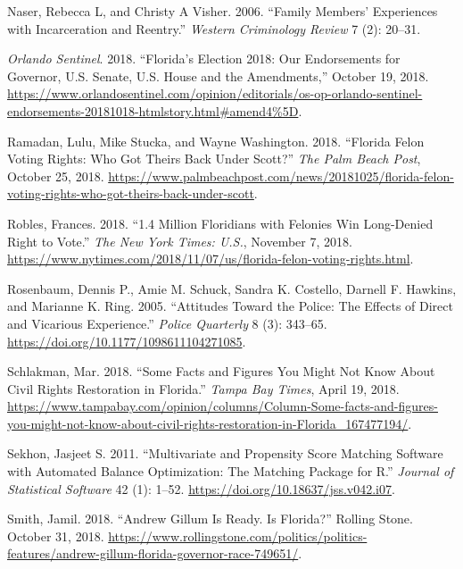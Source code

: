 \documentclass[
  12pt,
]{article}
\newlength{\cslhangindent}
\newenvironment{cslreferences}%
  {\setlength{\parindent}{0pt}%
  \everypar{\setlength{\hangindent}{\cslhangindent}}\ignorespaces}%
  {\par}
\begin{document}
\begin{cslreferences}
\leavevmode\hypertarget{ref-Naser2006}{}%
Naser, Rebecca L, and Christy A Visher. 2006. ``Family Members' Experiences with Incarceration and Reentry.'' \emph{Western Criminology Review} 7 (2): 20--31.

\leavevmode\hypertarget{ref-ORLANDOSENTINEL2018}{}%
\emph{Orlando Sentinel}. 2018. ``Florida's Election 2018: Our Endorsements for Governor, U.S. Senate, U.S. House and the Amendments,'' October 19, 2018. \url{https://www.orlandosentinel.com/opinion/editorials/os-op-orlando-sentinel-endorsements-20181018-htmlstory.html\#amend4\%5D}.

\leavevmode\hypertarget{ref-Ramadan2018}{}%
Ramadan, Lulu, Mike Stucka, and Wayne Washington. 2018. ``Florida Felon Voting Rights: Who Got Theirs Back Under Scott?'' \emph{The Palm Beach Post}, October 25, 2018. \url{https://www.palmbeachpost.com/news/20181025/florida-felon-voting-rights-who-got-theirs-back-under-scott}.

\leavevmode\hypertarget{ref-Robles2018}{}%
Robles, Frances. 2018. ``1.4 Million Floridians with Felonies Win Long-Denied Right to Vote.'' \emph{The New York Times: U.S.}, November 7, 2018. \url{https://www.nytimes.com/2018/11/07/us/florida-felon-voting-rights.html}.

\leavevmode\hypertarget{ref-Rosenbaum2005}{}%
Rosenbaum, Dennis P., Amie M. Schuck, Sandra K. Costello, Darnell F. Hawkins, and Marianne K. Ring. 2005. ``Attitudes Toward the Police: The Effects of Direct and Vicarious Experience.'' \emph{Police Quarterly} 8 (3): 343--65. \url{https://doi.org/10.1177/1098611104271085}.

\leavevmode\hypertarget{ref-Schlakman2018}{}%
Schlakman, Mar. 2018. ``Some Facts and Figures You Might Not Know About Civil Rights Restoration in Florida.'' \emph{Tampa Bay Times}, April 19, 2018. \url{https://www.tampabay.com/opinion/columns/Column-Some-facts-and-figures-you-might-not-know-about-civil-rights-restoration-in-Florida_167477194/}.

\leavevmode\hypertarget{ref-Sekhon2011}{}%
Sekhon, Jasjeet S. 2011. ``Multivariate and Propensity Score Matching Software with Automated Balance Optimization: The Matching Package for R.'' \emph{Journal of Statistical Software} 42 (1): 1--52. \url{https://doi.org/10.18637/jss.v042.i07}.

\leavevmode\hypertarget{ref-Smith2018}{}%
Smith, Jamil. 2018. ``Andrew Gillum Is Ready. Is Florida?'' Rolling Stone. October 31, 2018. \url{https://www.rollingstone.com/politics/politics-features/andrew-gillum-florida-governor-race-749651/}.


\end{cslreferences}
\end{document}
